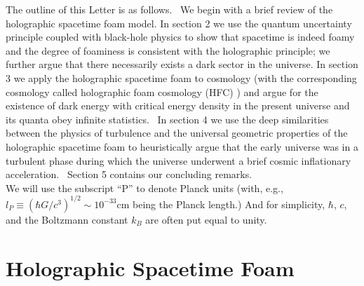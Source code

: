 \documentclass[12pt]{article}
\begin{document}
The outline of this Letter is as follows.  We begin with a brief review of the
holographic spacetime foam model.
In section 2 we use the quantum uncertainty principle coupled with black-hole physics to
show that spacetime is indeed foamy
and the degree of foaminess is consistent with the holographic principle; we
further argue that there necessarily exists
a dark sector in the universe. In section 3 we apply the holographic spacetime
foam to cosmology (with the
corresponding cosmology called holographic foam cosmology (HFC) \cite{Arzano,holocos}) 
and argue for the existence of dark energy with
critical energy density in the present universe and its quanta obey infinite
statistics.  In section 4 we use the deep similarities between 
the physics of turbulence and the universal geometric properties 
of the holographic spacetime foam to heuristically argue that the early universe 
was in a turbulent phase during which the universe
underwent a brief cosmic inflationary
acceleration.  Section 5 contains our concluding remarks.\\

We will use the subscript “P” to denote Planck units (with, e.g.,  
$l_P \equiv (\hbar G /c^3)^{1/2} \sim 10^{-33}$cm being the Planck length.) And for 
simplicity, $\hbar$, $c$, and the Boltzmann
constant $k_B$ are often put equal to unity.\\

\section{Holographic Spacetime Foam}
\end{document}
